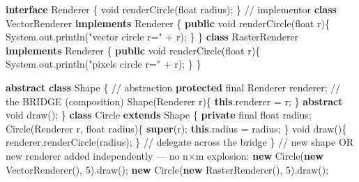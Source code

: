 \documentclass[11pt]{article}
\newenvironment{Shaded}{\begin{snugshade}}{\end{snugshade}}
\newcommand{\BuiltInTok}[1]{\textcolor[rgb]{0.50,0.55,0.55}{#1}}
\newcommand{\CommentTok}[1]{\textcolor[rgb]{0.48,0.49,0.49}{#1}}
\newcommand{\DataTypeTok}[1]{\textcolor[rgb]{0.16,0.50,0.73}{#1}}
\newcommand{\DecValTok}[1]{\textcolor[rgb]{0.96,0.45,0.00}{#1}}
\newcommand{\FunctionTok}[1]{\textcolor[rgb]{0.56,0.27,0.68}{#1}}
\newcommand{\KeywordTok}[1]{\textcolor[rgb]{0.81,0.81,0.76}{\textbf{#1}}}
\newcommand{\NormalTok}[1]{\textcolor[rgb]{0.81,0.81,0.76}{#1}}
\newcommand{\OperatorTok}[1]{\textcolor[rgb]{0.81,0.81,0.76}{#1}}
\newcommand{\StringTok}[1]{\textcolor[rgb]{0.96,0.31,0.31}{#1}}
\begin{document}
\begin{Shaded}
\begin{Highlighting}[]
\KeywordTok{interface} \BuiltInTok{Renderer} \OperatorTok{\{} \DataTypeTok{void} \FunctionTok{renderCircle}\OperatorTok{(}\DataTypeTok{float}\NormalTok{ radius}\OperatorTok{);} \OperatorTok{\}}                 \CommentTok{// implementor}
\KeywordTok{class}\NormalTok{ VectorRenderer }\KeywordTok{implements} \BuiltInTok{Renderer} \OperatorTok{\{}
    \KeywordTok{public} \DataTypeTok{void} \FunctionTok{renderCircle}\OperatorTok{(}\DataTypeTok{float}\NormalTok{ r}\OperatorTok{)\{} \BuiltInTok{System}\OperatorTok{.}\FunctionTok{out}\OperatorTok{.}\FunctionTok{println}\OperatorTok{(}\StringTok{"vector circle r="} \OperatorTok{+}\NormalTok{ r}\OperatorTok{);} \OperatorTok{\}}
\OperatorTok{\}}
\KeywordTok{class}\NormalTok{ RasterRenderer }\KeywordTok{implements} \BuiltInTok{Renderer} \OperatorTok{\{}
    \KeywordTok{public} \DataTypeTok{void} \FunctionTok{renderCircle}\OperatorTok{(}\DataTypeTok{float}\NormalTok{ r}\OperatorTok{)\{} \BuiltInTok{System}\OperatorTok{.}\FunctionTok{out}\OperatorTok{.}\FunctionTok{println}\OperatorTok{(}\StringTok{"pixels circle r="} \OperatorTok{+}\NormalTok{ r}\OperatorTok{);} \OperatorTok{\}}
\OperatorTok{\}}

\KeywordTok{abstract} \KeywordTok{class} \BuiltInTok{Shape} \OperatorTok{\{}                                                   \CommentTok{// abstraction}
    \KeywordTok{protected} \DataTypeTok{final} \BuiltInTok{Renderer}\NormalTok{ renderer}\OperatorTok{;}          \CommentTok{// the BRIDGE (composition)}
    \BuiltInTok{Shape}\OperatorTok{(}\BuiltInTok{Renderer}\NormalTok{ r}\OperatorTok{)\{} \KeywordTok{this}\OperatorTok{.}\FunctionTok{renderer} \OperatorTok{=}\NormalTok{ r}\OperatorTok{;} \OperatorTok{\}}
    \KeywordTok{abstract} \DataTypeTok{void} \FunctionTok{draw}\OperatorTok{();}
\OperatorTok{\}}
\KeywordTok{class}\NormalTok{ Circle }\KeywordTok{extends} \BuiltInTok{Shape} \OperatorTok{\{}
    \KeywordTok{private} \DataTypeTok{final} \DataTypeTok{float}\NormalTok{ radius}\OperatorTok{;}
    \FunctionTok{Circle}\OperatorTok{(}\BuiltInTok{Renderer}\NormalTok{ r}\OperatorTok{,} \DataTypeTok{float}\NormalTok{ radius}\OperatorTok{)\{} \KeywordTok{super}\OperatorTok{(}\NormalTok{r}\OperatorTok{);} \KeywordTok{this}\OperatorTok{.}\FunctionTok{radius} \OperatorTok{=}\NormalTok{ radius}\OperatorTok{;} \OperatorTok{\}}
    \DataTypeTok{void} \FunctionTok{draw}\OperatorTok{()\{}\NormalTok{ renderer}\OperatorTok{.}\FunctionTok{renderCircle}\OperatorTok{(}\NormalTok{radius}\OperatorTok{);} \OperatorTok{\}}   \CommentTok{// delegate across the bridge}
\OperatorTok{\}}
\CommentTok{// new shape OR new renderer added independently — no n×m explosion:}
\KeywordTok{new} \FunctionTok{Circle}\OperatorTok{(}\KeywordTok{new} \FunctionTok{VectorRenderer}\OperatorTok{(),} \DecValTok{5}\OperatorTok{).}\FunctionTok{draw}\OperatorTok{();}
\KeywordTok{new} \FunctionTok{Circle}\OperatorTok{(}\KeywordTok{new} \FunctionTok{RasterRenderer}\OperatorTok{(),} \DecValTok{5}\OperatorTok{).}\FunctionTok{draw}\OperatorTok{();}
\end{Highlighting}
\end{Shaded}
\end{document}
